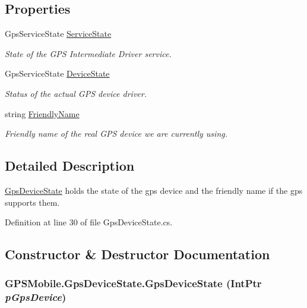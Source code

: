 \subsection*{Properties}
\begin{DoxyCompactItemize}
\item 
GpsServiceState \hyperlink{class_g_p_s_mobile_1_1_gps_device_state_aa6ae395d7f3d97e5ec218882aa673ef6}{ServiceState}
\begin{DoxyCompactList}\small\item\em State of the GPS Intermediate Driver service. \item\end{DoxyCompactList}\item 
GpsServiceState \hyperlink{class_g_p_s_mobile_1_1_gps_device_state_a95d80e824e8df9444a76608d6767c4da}{DeviceState}
\begin{DoxyCompactList}\small\item\em Status of the actual GPS device driver. \item\end{DoxyCompactList}\item 
string \hyperlink{class_g_p_s_mobile_1_1_gps_device_state_a8e4ee60285e5ae875c3999aa56ef3510}{FriendlyName}
\begin{DoxyCompactList}\small\item\em Friendly name of the real GPS device we are currently using. \item\end{DoxyCompactList}\end{DoxyCompactItemize}


\subsection{Detailed Description}
\hyperlink{class_g_p_s_mobile_1_1_gps_device_state}{GpsDeviceState} holds the state of the gps device and the friendly name if the gps supports them. 

Definition at line 30 of file GpsDeviceState.cs.

\subsection{Constructor \& Destructor Documentation}
\hypertarget{class_g_p_s_mobile_1_1_gps_device_state_a83d5d8cc7c5e9370d5a3ebf2a940f7bf}{
\subsubsection[{GpsDeviceState}]{\setlength{\rightskip}{0pt plus 5cm}GPSMobile.GpsDeviceState.GpsDeviceState (IntPtr {\em pGpsDevice})}}
\label{class_g_p_s_mobile_1_1_gps_device_state_a83d5d8cc7c5e9370d5a3ebf2a940f7bf}


